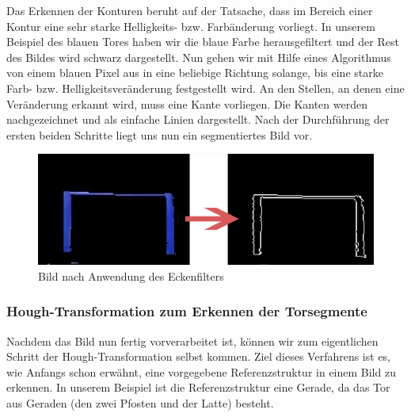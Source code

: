 \documentclass[a4paper,12pt]{article}
\begin{document}
Das Erkennen der Konturen beruht auf der Tatsache, dass im Bereich einer
Kontur eine sehr starke Helligkeits- bzw. Farbänderung vorliegt. In unserem
Beispiel des blauen Tores haben wir die blaue Farbe herausgefiltert und
der Rest des Bildes wird schwarz dargestellt. Nun gehen wir mit Hilfe
eines Algorithmus von einem blauen Pixel aus in eine beliebige Richtung solange,
bis eine starke Farb- bzw. Helligkeitsveränderung festgestellt wird.
An den Stellen, an denen eine Veränderung erkannt wird, muss eine Kante
vorliegen. Die Kanten werden nachgezeichnet und als einfache Linien
dargestellt. Nach der Durchführung der ersten beiden Schritte liegt
uns nun ein segmentiertes Bild vor.
\begin{figure}[H]
    \includegraphics[scale=0.6]{eckenfilter.jpg}
    \caption{Bild nach Anwendung des Eckenfilters}
    \label{fig:eckenfilter}
\end{figure}
\subsubsection{Hough-Transformation zum Erkennen der Torsegmente}
Nachdem das Bild nun fertig vorverarbeitet ist, können wir zum eigentlichen Schritt der
Hough-Transformation selbst kommen. Ziel dieses Verfahrens ist es, wie Anfangs schon erwähnt,
eine vorgegebene Referenzstruktur in einem Bild zu erkennen. In unserem Beispiel
ist die Referenzstruktur eine Gerade, da das Tor aus Geraden
(den zwei Pfosten und der Latte) besteht.
\end{document}
